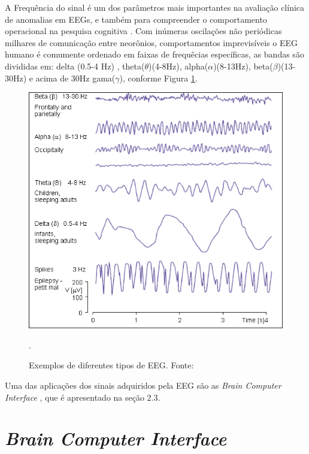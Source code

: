 A Frequência do sinal é um dos parâmetros mais importantes na avaliação clínica de anomalias em EEGs, e também para compreender o comportamento operacional na pesquisa cognitiva \cite{SIULYDissertacao}.
Com inúmeras oscilações não periódicas milhares de comunicação entre neorônios, comportamentos imprevisíveis o EEG humano é comumente ordenado  em faixas de frequêcias específicas, as bandas são divididas em: delta
 (0.5-4 Hz) , theta($\theta$)(4-8Hz), alpha($\alpha$)(8-13Hz), beta($\beta$)(13-30Hz) e acima de 30Hz gama($\gamma$), conforme Figura \ref{EEGcomun}.
 \newline

\begin{figure}[h]
	\centering
	\includegraphics[keepaspectratio=true,scale=0.75]{figuras/formas_EEG.png}
	\caption{Exemplos de diferentes tipos de EEG. Fonte: \cite{campisi2012eeg}}.
	\label{EEGcomun}
\end{figure}

Uma das aplicações dos sinais adquiridos pela EEG são as \textit{Brain Computer Interface} \cite{F.Lotte, SIULYDissertacao}, que é apresentado na seção 2.3.


\section{\textit{Brain Computer Interface}}

